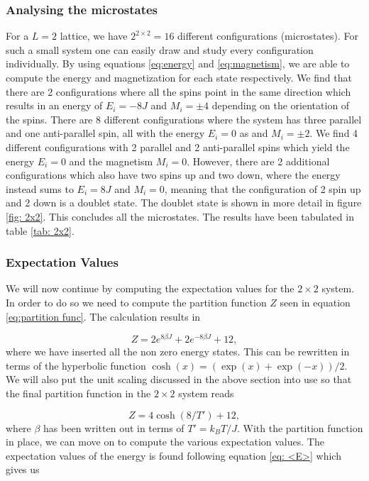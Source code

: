 \documentclass[a4paper, 10pt, reqno]{amsart}
\begin{document}
\subsubsection{Analysing the microstates} For a $L = 2$ lattice, we have $2^{2\times 2} = 16$ different
configurations (microstates). For such a small system one can easily draw and
study every configuration individually. By using equations \eqref{eq:energy}
and \eqref{eq:magnetism}, we are able to compute the energy and magnetization
for each state respectively. We find that there are 2 configurations where
all the spins point in the same direction which results in an energy of $E_i
= -8J$ and $M_i = \pm 4$ depending on the orientation of the spins. There are
8 different configurations where the system has three parallel and one
anti-parallel spin, all with the energy $E_i = 0$ as and $M_i =  \pm 2$. We
find 4 different configurations with 2 parallel and 2 anti-parallel spins
which yield the energy $E_i = 0$ and the magnetism $M_i =0$. However, there
are 2 additional configurations which also have two spins up and two down,
where the energy instead sums to $E_i = 8J$ and $M_i = 0$, meaning that the
configuration of 2 spin up and 2 down is a doublet state. The doublet state is shown in more detail in figure \ref{fig: 2x2}. This concludes all
the microstates. The results have been tabulated in table
\ref{tab: 2x2}.

\subsubsection{Expectation Values} We will now continue by computing the
expectation values for the $2\times 2$
system. In order to do so we need to compute the partition function $Z$ seen
in equation \eqref{eq:partition func}. The calculation results in

\begin{equation*}
    Z  = 2 e^{ 8\beta J} + 2e^{-8 \beta J} + 12,
\end{equation*}
where we have inserted all the non zero energy states. This can be
rewritten in terms of the hyperbolic function $\cosh(x) = (\exp(x) +
\exp(-x))/2$. We will also put the unit scaling discussed in the above
section into use so that the final partition function in the $2 \times 2$
system reads

\begin{equation}\label{eq 2x2 part}
    Z = 4 \cosh (8/T') + 12,
\end{equation}
where $\beta$ has been written out in terms of $T' = k_BT/J$. With the partition function in place, we can move on to
compute the various expectation values. The expectation values of the energy
is found following equation \eqref{eq: <E>} which gives us
\end{document}
